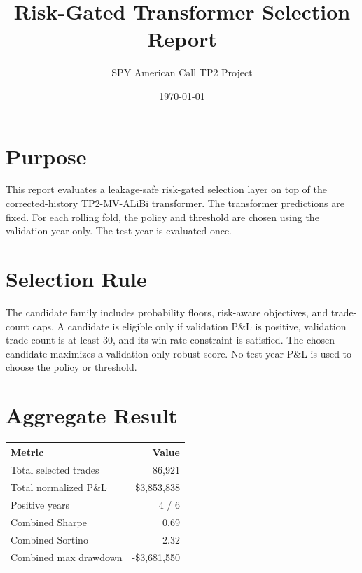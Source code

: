 \documentclass[11pt]{article}
\title{Risk-Gated Transformer Selection Report}
\author{SPY American Call TP2 Project}
\date{\today}
\begin{document}
\maketitle

\section{Purpose}
This report evaluates a leakage-safe risk-gated selection layer on top of the corrected-history TP2-MV-ALiBi transformer. The transformer predictions are fixed. For each rolling fold, the policy and threshold are chosen using the validation year only. The test year is evaluated once.

\section{Selection Rule}
The candidate family includes probability floors, risk-aware objectives, and trade-count caps. A candidate is eligible only if validation P\&L is positive, validation trade count is at least 30, and its win-rate constraint is satisfied. The chosen candidate maximizes a validation-only robust score. No test-year P\&L is used to choose the policy or threshold.

\section{Aggregate Result}
\begin{table}[H]
\centering
\begin{tabular}{lr}
\toprule
Metric & Value \\
\midrule
Total selected trades & 86,921 \\
Total normalized P\&L & \$3,853,838 \\
Positive years & 4 / 6 \\
Combined Sharpe & 0.69 \\
Combined Sortino & 2.32 \\
Combined max drawdown & -\$3,681,550 \\
\bottomrule
\end{tabular}
\end{table}
\end{document}
